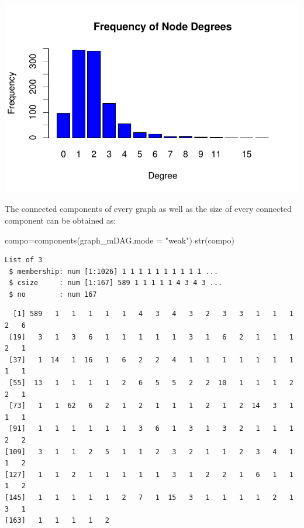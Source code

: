 \documentclass[
  letterpaper,
  DIV=11,
  numbers=noendperiod]{scrreprt}
\newenvironment{Shaded}{}{}
\newcommand{\AttributeTok}[1]{\textcolor[rgb]{0.78,0.47,0.87}{#1}}
\newcommand{\FunctionTok}[1]{\textcolor[rgb]{0.38,0.69,0.94}{#1}}
\newcommand{\NormalTok}[1]{\textcolor[rgb]{0.67,0.70,0.75}{#1}}
\newcommand{\OtherTok}[1]{\textcolor[rgb]{0.15,0.68,0.38}{#1}}
\newcommand{\SpecialCharTok}[1]{\textcolor[rgb]{0.34,0.71,0.76}{#1}}
\newcommand{\StringTok}[1]{\textcolor[rgb]{0.60,0.76,0.47}{#1}}
\begin{document}
\includegraphics[width=1\textwidth,height=\textheight]{metabolic_graphs_files/figure-pdf/unnamed-chunk-10-1.pdf}

The connected components of every graph as well as the size of every
connected component can be obtained as:

\begin{Shaded}
\begin{Highlighting}[]
\NormalTok{compo}\OtherTok{=}\FunctionTok{components}\NormalTok{(graph\_mDAG,}\AttributeTok{mode =} \StringTok{"weak"}\NormalTok{)}
\FunctionTok{str}\NormalTok{(compo)}
\end{Highlighting}
\end{Shaded}

\begin{verbatim}
List of 3
 $ membership: num [1:1026] 1 1 1 1 1 1 1 1 1 1 ...
 $ csize     : num [1:167] 589 1 1 1 1 1 4 3 4 3 ...
 $ no        : num 167
\end{verbatim}

\begin{Shaded}
\end{Shaded}

\begin{verbatim}
  [1] 589   1   1   1   1   1   4   3   4   3   2   3   3   1   1   1   2   6
 [19]   3   1   3   6   1   1   1   1   1   3   1   6   2   1   1   1   2   1
 [37]   1  14   1  16   1   6   2   2   4   1   1   1   1   1   1   1   1   1
 [55]  13   1   1   1   1   2   6   5   5   2   2  10   1   1   1   2   2   1
 [73]   1   1  62   6   2   1   2   1   1   1   2   1   2  14   3   1   1   1
 [91]   1   1   1   1   1   1   3   6   1   3   1   3   2   1   1   1   2   2
[109]   3   1   1   2   5   1   1   2   3   2   1   1   2   3   4   1   1   2
[127]   1   1   2   1   1   1   1   1   3   1   2   2   1   6   1   1   1   2
[145]   1   1   1   1   1   2   7   1  15   3   1   1   1   1   2   1   3   1
[163]   1   1   1   1   2
\end{verbatim}
\end{document}
